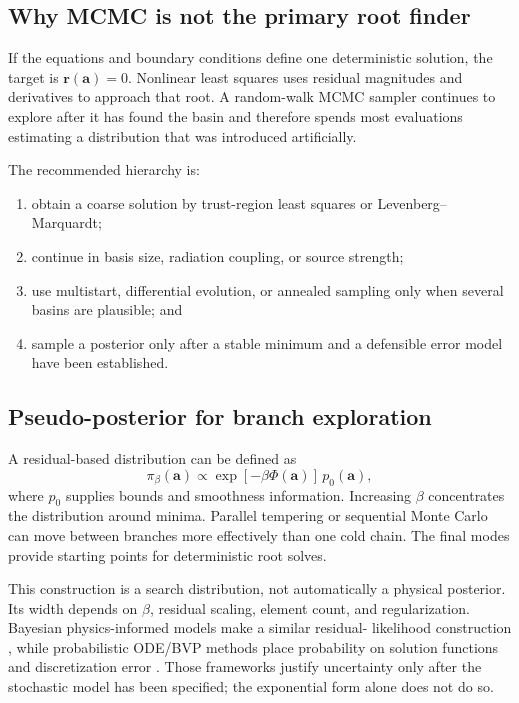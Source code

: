\documentclass[english,a4paper]{my_memo}
\newcommand{\vect}[1]{\mathbf{#1}}
\newcommand{\coef}{\vect{a}}
\begin{document}
\subsection{Why MCMC is not the primary root finder}

If the equations and boundary conditions define one deterministic solution,
the target is \(\vect{r}(\coef)=0\).  Nonlinear least squares uses residual
magnitudes and derivatives to approach that root.  A random-walk MCMC sampler
continues to explore after it has found the basin and therefore spends most
evaluations estimating a distribution that was introduced artificially.

The recommended hierarchy is:
\begin{enumerate}
\item obtain a coarse solution by trust-region least squares or
  Levenberg--Marquardt;
\item continue in basis size, radiation coupling, or source strength;
\item use multistart, differential evolution, or annealed sampling only when
  several basins are plausible; and
\item sample a posterior only after a stable minimum and a defensible error
  model have been established.
\end{enumerate}

\subsection{Pseudo-posterior for branch exploration}

A residual-based distribution can be defined as
\begin{equation}
 \pi_\beta(\coef)\propto
 \exp[-\beta\Phi(\coef)]\,p_0(\coef),
 \label{eq:pseudoposterior}
\end{equation}
where \(p_0\) supplies bounds and smoothness information.  Increasing
\(\beta\) concentrates the distribution around minima.  Parallel tempering or
sequential Monte Carlo can move between branches more effectively than one cold
chain.  The final modes provide starting points for deterministic root solves.

This construction is a search distribution, not automatically a physical
posterior.  Its width depends on \(\beta\), residual scaling, element count,
and regularization.  Bayesian physics-informed models make a similar residual-
likelihood construction \cite{Yang2021}, while probabilistic ODE/BVP methods
place probability on solution functions and discretization error
\cite{Chkrebtii2016,Kramer2021}.  Those frameworks justify uncertainty only
after the stochastic model has been specified; the exponential form alone does
not do so.
\end{document}
